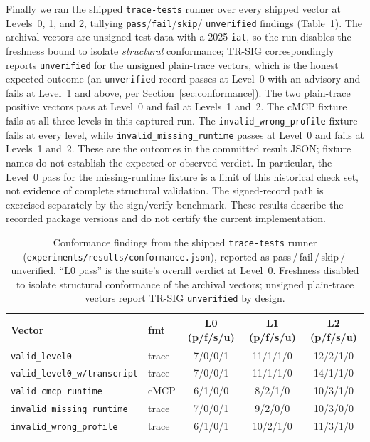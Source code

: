 Finally we ran the shipped \texttt{trace-tests} runner over every shipped vector
at Levels~0, 1, and 2, tallying \texttt{pass}/\texttt{fail}/\texttt{skip}/%
\texttt{unverified} findings (Table~\ref{tab:eval-conf}). The archival vectors
are unsigned test data with a 2025 \texttt{iat}, so the run disables the freshness
bound to isolate \emph{structural} conformance; TR-SIG correspondingly reports
\texttt{unverified} for the unsigned plain-trace vectors, which is the honest
expected outcome (an \texttt{unverified} record passes at Level~0 with an advisory
and fails at Level~1 and above, per Section~\ref{sec:conformance}). The two plain-trace positive vectors pass at Level~0 and fail at
Levels~1 and~2. The cMCP fixture fails at all three levels in this captured run.
The \texttt{invalid\_wrong\_profile} fixture fails at every level, while
\texttt{invalid\_missing\_runtime} passes at Level~0 and fails at Levels~1 and~2.
These are the outcomes in the committed result JSON; fixture names do not
establish the expected or observed verdict. In particular, the Level~0 pass
for the missing-runtime fixture is a limit of this historical check set,
not evidence of complete structural validation. The signed-record path is
exercised separately by the sign/verify benchmark. These results describe
the recorded package versions and do not certify the current implementation.

\begin{table}[h]
\centering
\small
\caption{Conformance findings from the shipped \texttt{trace-tests} runner
(\texttt{experiments/results/conformance.json}), reported as
pass\,/\,fail\,/\,skip\,/\,unverified. ``L0 pass'' is the suite's overall verdict
at Level~0. Freshness disabled to isolate structural conformance of the archival
vectors; unsigned plain-trace vectors report TR-SIG \texttt{unverified} by design.}
\label{tab:eval-conf}
\begin{tabular}{llccc}
\toprule
Vector & fmt & L0 (p/f/s/u) & L1 (p/f/s/u) & L2 (p/f/s/u) \\
\midrule
\texttt{valid\_level0}              & trace & 7/0/0/1 & 11/1/1/0 & 12/2/1/0 \\
\texttt{valid\_level0\_w/transcript} & trace & 7/0/0/1 & 11/1/1/0 & 14/1/1/0 \\
\texttt{valid\_cmcp\_runtime}       & cMCP  & 6/1/0/0 & 8/2/1/0  & 10/3/1/0 \\
\texttt{invalid\_missing\_runtime}  & trace & 7/0/0/1 & 9/2/0/0  & 10/3/0/0 \\
\texttt{invalid\_wrong\_profile}    & trace & 6/1/0/1 & 10/2/1/0 & 11/3/1/0 \\
\bottomrule
\end{tabular}
\end{table}

